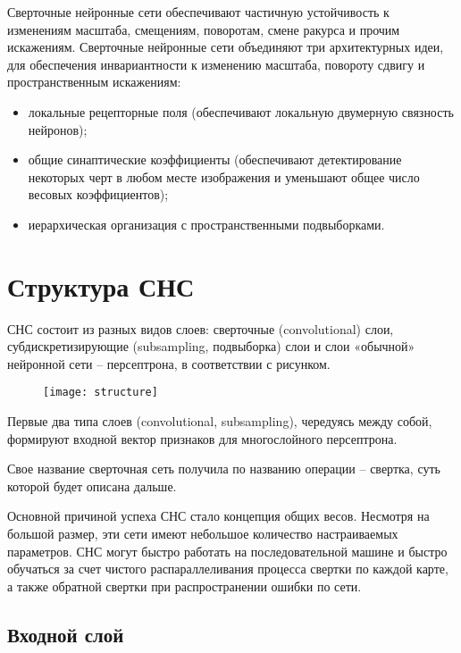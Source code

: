 \documentclass[11pt,colorlinks=true]{article}
\begin{document}
Сверточные нейронные сети обеспечивают частичную устойчивость к изменениям масштаба, смещениям, поворотам, смене ракурса и прочим искажениям. Сверточные нейронные сети объединяют три архитектурных идеи, для обеспечения инвариантности к изменению масштаба, повороту сдвигу и пространственным искажениям:
\begin{itemize}
	\item локальные рецепторные поля (обеспечивают локальную двумерную связность нейронов);
	\item общие синаптические коэффициенты (обеспечивают детектирование некоторых черт в любом месте изображения и уменьшают общее число весовых коэффициентов);
	\item иерархическая организация с пространственными подвыборками.
\end{itemize}

\section{Структура СНС}
СНС состоит из разных видов слоев: сверточные (convolutional) слои, субдискретизирующие (subsampling, подвыборка) слои и слои «обычной» нейронной сети – персептрона, в соответствии с рисунком.

\begin{figure}[h]
		\begin{center}
				\begin{minipage}[h]{1\linewidth}
					\texttt{[image: structure]}
				\end{minipage}
			\end{center}
		\end{figure}
	
Первые два типа слоев (convolutional, subsampling), чередуясь между собой, формируют входной вектор признаков для многослойного персептрона.

Свое название сверточная сеть получила по названию операции – свертка, суть которой будет описана дальше. 

Основной причиной успеха СНС стало концепция общих весов. Несмотря на большой размер, эти сети имеют небольшое количество настраиваемых параметров. СНС могут быстро работать на последовательной машине и быстро обучаться за счет чистого распараллеливания процесса свертки по каждой карте, а также обратной свертки при распространении ошибки по сети.

\subsection{Входной слой}
\end{document}
